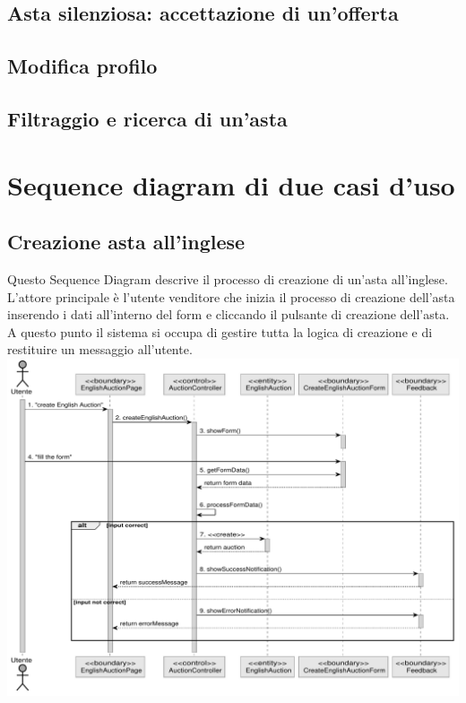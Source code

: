 {	\subsection*{Asta silenziosa: accettazione di un'offerta}
	
	\newpage

	\subsection*{Modifica profilo}
	
	\newpage

	\subsection*{Filtraggio e ricerca di un'asta}
	
} %

\newpage
\section{Sequence diagram di due casi d'uso}
\subsection{Creazione asta all'inglese}
Questo Sequence Diagram descrive il processo di creazione di un'asta all'inglese. 
\\ L'attore principale è l'utente venditore che inizia il processo di creazione dell'asta inserendo i dati all'interno del form e cliccando il pulsante di creazione dell'asta.
\\ A questo punto il sistema si occupa di gestire tutta la logica di creazione e di restituire un messaggio all'utente.   
\\
\includegraphics[width=\textwidth]{assets/sequence/creazione_asta_inglese.pdf}
\newpage

